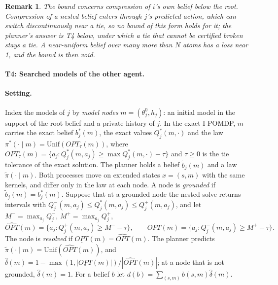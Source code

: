\documentclass{article}
\newcommand{\OPT}{\mathit{OPT}}
\newtheorem{remark}{Remark}
\begin{document}
\begin{remark}
The bound concerns compression of $i$'s own belief below the root. Compression of a nested belief enters through $j$'s predicted action, which can switch discontinuously near a tie, so no bound of this form holds for it; the planner's answer is T4 below, under which a tie that cannot be certified broken stays a tie. A near-uniform belief over many more than $N$ atoms has a loss near 1, and the bound is then void.
\end{remark}

\paragraph{T4: Searched models of the other agent.}

\paragraph{Setting.} Index the models of $j$ by \emph{model nodes} $m=(\theta_j^0,h_j)$: an initial model in the
support of the root belief and a private history of $j$. In the exact I-POMDP, $m$ carries the exact belief
$b_j^\ast(m)$, the exact values $Q_j^\ast(m,\cdot)$ and the law
$\pi^\ast(\cdot\mid m)=\mathrm{Unif}(\OPT_\tau(m))$, where $\OPT_\tau(m)=\{a_j:Q_j^\ast(m,a_j)\ge
\max Q_j^\ast(m,\cdot)-\tau\}$ and $\tau\ge0$ is the tie tolerance of the exact solution. The planner holds a
belief $\tilde b_j(m)$ and a law $\tilde\pi(\cdot\mid m)$. Both processes move on extended states
$x=(s,m)$ with the same kernels, and differ only in the law at each node. A node is \emph{grounded} if
$\tilde b_j(m)=b_j^\ast(m)$. Suppose that at a grounded node the nested solve returns intervals with
$Q_j^-(m,a_j)\le Q_j^\ast(m,a_j)\le Q_j^+(m,a_j)$, and let $M^-=\max_{a_j}Q_j^-$, $M^+=\max_{a_j}Q_j^+$,
\[
\widehat{\OPT}(m)=\{a_j:Q_j^+(m,a_j)\ge M^--\tau\},\qquad
\underline{\OPT}(m)=\{a_j:Q_j^-(m,a_j)\ge M^+-\tau\}.
\]
The node is \emph{resolved} if $\underline{\OPT}(m)=\widehat{\OPT}(m)$. The planner predicts
$\tilde\pi(\cdot\mid m)=\mathrm{Unif}(\widehat{\OPT}(m))$, and
$\hat\delta(m)=1-\max(1,|\underline{\OPT}(m)|)/|\widehat{\OPT}(m)|$; at a node that is not grounded,
$\hat\delta(m)=1$. For a belief $b$ let $d(b)=\sum_{(s,m)}b(s,m)\hat\delta(m)$.
\end{document}
